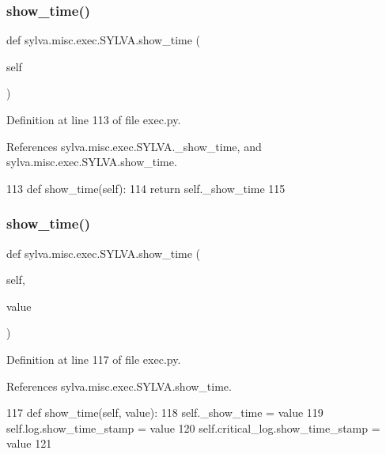 \subsubsection{\texorpdfstring{show\+\_\+time()}{show\_time()}\hspace{0.1cm}{\footnotesize\ttfamily [1/2]}}
{\footnotesize\ttfamily def sylva.\+misc.\+exec.\+S\+Y\+L\+V\+A.\+show\+\_\+time (\begin{DoxyParamCaption}\item[{}]{self }\end{DoxyParamCaption})}



Definition at line 113 of file exec.\+py.



References sylva.\+misc.\+exec.\+S\+Y\+L\+V\+A.\+\_\+show\+\_\+time, and sylva.\+misc.\+exec.\+S\+Y\+L\+V\+A.\+show\+\_\+time.


\begin{DoxyCode}
113   \textcolor{keyword}{def }show\_time(self):
114     \textcolor{keywordflow}{return} self.\_show\_time
115 
\end{DoxyCode}
\mbox{\label{classsylva_1_1misc_1_1exec_1_1_s_y_l_v_a_abb74332dd1f03c16134957f1e792cb60}} 
\subsubsection{\texorpdfstring{show\+\_\+time()}{show\_time()}\hspace{0.1cm}{\footnotesize\ttfamily [2/2]}}
{\footnotesize\ttfamily def sylva.\+misc.\+exec.\+S\+Y\+L\+V\+A.\+show\+\_\+time (\begin{DoxyParamCaption}\item[{}]{self,  }\item[{}]{value }\end{DoxyParamCaption})}



Definition at line 117 of file exec.\+py.



References sylva.\+misc.\+exec.\+S\+Y\+L\+V\+A.\+show\+\_\+time.


\begin{DoxyCode}
117   \textcolor{keyword}{def }show\_time(self, value):
118     self.\_show\_time = value
119     self.log.show\_time\_stamp = value
120     self.critical\_log.show\_time\_stamp = value
121 
\end{DoxyCode}


